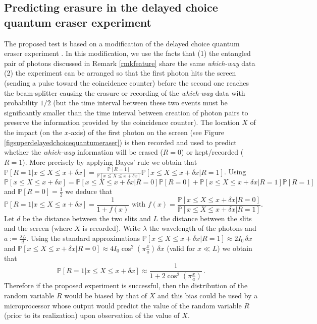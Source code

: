 \documentclass[11pt]{article}
\renewcommand{\P}{\mathbb{P}}
\theoremstyle{definition}
\begin{document}
\subsection{Predicting erasure in the delayed choice quantum eraser experiment}\label{secpredict}
The proposed test is based on  a modification of the delayed choice quantum eraser experiment \cite{kim2000delayed}.
In this modification,  we use the facts that (1) the entangled pair of photons discussed in  Remark \ref{rmkfeature} share the same \emph{which-way} data (2) the experiment can be arranged so that the  first photon  hits the screen (sending a pulse toward the coincidence counter) before the second one reaches the beam-splitter causing the erasure or recording of the \emph{which-way} data with probability $1/2$ (but the time interval between these two events must be significantly smaller than the time interval between creation of photon pairs to preserve the information provided by the coincidence counter).
The location $X$ of the impact (on the $x$-axis) of the first photon on the screen (see Figure \ref{figsuperdelayedchoicequantumeraser}) is then recorded and used to predict whether the \emph{which-way} information will be erased ($R=0$) or kept/recorded ($R=1$).
More precisely by applying Bayes' rule we obtain that
 $\P[R=1|x\leq X\leq x+\delta x]=\frac{\P[R=1]}{\P[x\leq X\leq x+\delta x]} \P[x\leq X\leq x+\delta x|R=1]$.
Using $\P[x\leq X\leq x+\delta x]=\P[x\leq X\leq x+\delta x|R=0] \P[R=0]+
\P[x\leq X\leq x+\delta x|R=1] \P[R=1]$ and $\P[R=0]=\frac{1}{2}$ we deduce that
\begin{equation}
\P[R=1|x\leq X\leq x+\delta x]= \frac{1}{1 + f(x)} \text{ with }f(x)=\frac{\P[x\leq X\leq x+\delta x|R=0]}{\P[x\leq X\leq x+\delta x|R=1] }.
\end{equation}
Let $d$ be the distance between the two slits and $L$ the distance between the slits and the screen (where $X$ is recorded). Write $\lambda$ the wavelength of the photons and $a := \frac{\lambda L}{d}$.
Using the standard approximations $\P[x\leq X\leq x+\delta x|R=1]\approx 2 I_0 \,\delta x$ and
$\P[x\leq X\leq x+\delta x|R=0]\approx 4 I_0 \cos^2(\pi \frac{x}{a})\,\delta x$ (valid  for $x\ll L$) we obtain that
\begin{equation}
\P[R=1|x\leq X\leq x+\delta x]\approx  \frac{1}{1 + 2 \cos^2(\pi \frac{x}{a})}\,.
\end{equation}
Therefore if the proposed experiment is successful, then the distribution of the random variable $R$ would be biased by that of $X$ and this bias could be used by a microprocessor whose output would predict the value of the random variable $R$ (prior to its realization) upon observation of the value of $X$.
\end{document}
